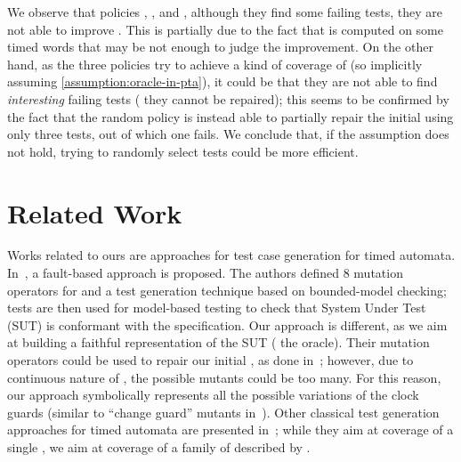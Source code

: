 \begin{tikzborder}{\cite{Gargantini16:validation}}
\begin{tikzborder}{\cite{gargantini_combinatorial_2017}}
\begin{tikzborder}{\cite{garn2019}}
\begin{tikzborder}{\cite{arcaini2019achieving}}
\begin{tikzborder}{\cite{arcaini2019varivolution}}
\begin{tikzborder}{}
We observe that policies \policyminusplus, \policymiddle, and \policyquarter, although they find some failing tests, they are not able to improve \semConf. This is partially due to the fact that \semConf is computed on some timed words \testDataConf that may be not enough to judge the improvement. On the other hand, as the three policies try to achieve a kind of coverage of \ptaProc (so implicitly assuming \ref{assumption:oracle-in-pta}), it could be that they are not able to find {\it interesting} failing tests (\ie{} they cannot be repaired); this seems to be confirmed by the fact that the random policy \policyrand is instead able to partially repair the initial \ta using only three tests, out of which one fails. We conclude that, if the assumption does not hold, trying to randomly select tests could be more efficient.
\end{tikzborder}

\section{Related Work}\label{sec:related1}

\bb Works related to ours are approaches for test case generation for timed automata. In~\cite{aichernig2013time,aichernig2014debugging}, a fault-based approach is proposed. The authors defined 8 mutation operators for \tas and a test generation technique based on bounded-model checking; tests are then used for model-based testing to check that System Under Test (SUT) is conformant with the specification. Our approach is different, as we aim at building a faithful representation of the SUT (\ie{} the oracle). Their mutation operators could be used to repair our initial \ta, as done in~\cite{arcaini2019achieving}; however, due to continuous nature of \tas, the possible mutants could be too many. For this reason, our approach symbolically represents all the possible variations of the clock guards (similar to ``change guard'' mutants in~\cite{aichernig2013time}). Other classical test generation approaches for timed automata are presented in~\cite{springintveld2001testing,Hessel2008}; while they aim at coverage of a single \ta, we aim at coverage of a family of \tas described by \ptaProc.




\end{tikzborder}
\end{tikzborder}
\end{tikzborder}
\end{tikzborder}
\end{tikzborder}
